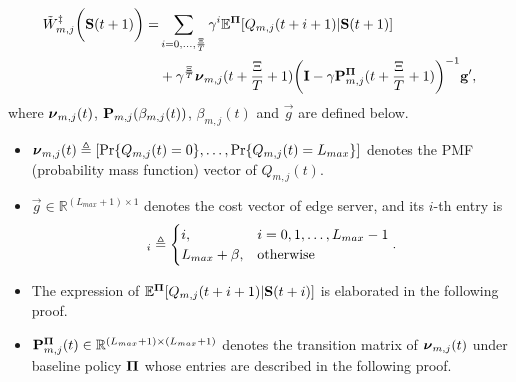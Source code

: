 \begin{lemma}
    \label{lemma:w_es}
    \begin{align}
    \tilde{W}^{\ddagger}_{m,j}\bigg(\mathbf{S}(t+1)\bigg)
    = &\sum_{i=0,\dots,\frac{\Xi}{T}} \gamma^{i} \mathbb{E}^{\mathbf{\Pi}}[ Q_{m,j}({t+i+1}) | \mathbf{S}(t+1)]
    \nonumber\\
    &+ \gamma^{\frac{\Xi}{T}} 
    \boldsymbol{\nu}_{m,j}({t+\frac{\Xi}{T}+1})
    \bigg(
        \mathbf{I} - \gamma \mathbf{P}^{\mathbf{\Pi}}_{m,j}(t+\frac{\Xi}{T}+1)
    \bigg)^{-1} \mathbf{g}',
        \label{w_es}
    \end{align}   
    where $\boldsymbol{\nu}_{m,j}(t)$, $\mathbf{P}_{m,j}(\beta_{m,j}(t))$, $\beta_{m,j}(t)$ and $\vec{g}$ are defined below.
    \begin{itemize}
        \item
        $\boldsymbol{\nu}_{m,j}(t) \triangleq [\Pr\{Q_{m,j}(t)=0\}, \dots, \Pr\{Q_{m,j}(t)=L_{max}\}]$
        denotes the PMF (probability mass function) vector of $Q_{m,j}(t)$.
        \item $\vec{g} \in \mathbb{R}^{(L_{max}+1) \times 1}$ denotes the cost vector of edge server, and its $i$-th entry is
        \begin{align}
            [\vec{g}]_{i} \define 
            \begin{cases}
                i, & i=0,1,\dots,L_{max}-1
                \\
                L_{max}+\beta, & \text{otherwise}
            \end{cases}.
            \label{eqn:g_vec}
        \end{align}
        \item The expression of $\mathbb{E}^{\mathbf{\Pi}}[ Q_{m,j}({t+i+1}) | \mathbf{S}(t+i)]$ is elaborated in the following proof.
        \item $\mathbf{P}^{\mathbf{\Pi}}_{m,j}(t) \in \mathbb{R}^{(L_{max}+1) \times (L_{max}+1)}$ denotes the transition matrix of $\boldsymbol{\nu}_{m,j}(t)$ under baseline policy $\mathbf{\Pi}$ whose entries are described in the following proof.
    \end{itemize}
\end{lemma}
